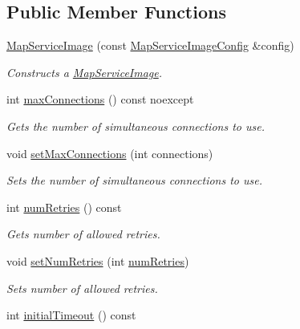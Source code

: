 \subsection*{Public Member Functions}
\begin{DoxyCompactItemize}
\item 
\hyperlink{classdg_1_1deepcore_1_1imagery_1_1_map_service_image_abdf5dd9f1d43df9198e7f755d383a982}{Map\+Service\+Image} (const \hyperlink{structdg_1_1deepcore_1_1imagery_1_1_map_service_image_config}{Map\+Service\+Image\+Config} \&config)
\begin{DoxyCompactList}\small\item\em Constructs a \hyperlink{classdg_1_1deepcore_1_1imagery_1_1_map_service_image}{Map\+Service\+Image}. \end{DoxyCompactList}\item 
int \hyperlink{group___imagery_module_ga1774c7d4c06c8e18a98db65b088b19b9}{max\+Connections} () const noexcept
\begin{DoxyCompactList}\small\item\em Gets the number of simultaneous connections to use. \end{DoxyCompactList}\item 
void \hyperlink{group___imagery_module_gacdb5a20006863ccb0f9601362e635df9}{set\+Max\+Connections} (int connections)
\begin{DoxyCompactList}\small\item\em Sets the number of simultaneous connections to use. \end{DoxyCompactList}\item 
int \hyperlink{classdg_1_1deepcore_1_1imagery_1_1_map_service_image_a67022c59d300b94c472d3d6b0e4254fb}{num\+Retries} () const 
\begin{DoxyCompactList}\small\item\em Gets number of allowed retries. \end{DoxyCompactList}\item 
void \hyperlink{classdg_1_1deepcore_1_1imagery_1_1_map_service_image_ac1b795032697774aaae91ef2ed8c1875}{set\+Num\+Retries} (int \hyperlink{classdg_1_1deepcore_1_1imagery_1_1_map_service_image_a67022c59d300b94c472d3d6b0e4254fb}{num\+Retries})
\begin{DoxyCompactList}\small\item\em Sets number of allowed retries. \end{DoxyCompactList}\item 
int \hyperlink{classdg_1_1deepcore_1_1imagery_1_1_map_service_image_a180cfdfa718df0f1368f03d78362e5db}{initial\+Timeout} () const 

\end{DoxyCompactItemize}
